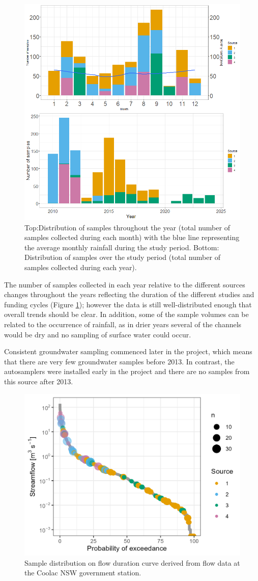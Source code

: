 \documentclass[, manuscript]{copernicus}
\begin{document}
\begin{figure}
\includegraphics[width=0.7\linewidth]{Figures/timeDist} \caption{Top:Distribution of samples throughout the year (total number of samples collected during each month) with the blue line representing the average monthly rainfall during the study period. Bottom: Distribution of samples over the study period (total number of samples collected during each year).}\label{fig:timedist-plot}
\end{figure}

The number of samples collected in each year relative to the different
sources changes throughout the years reflecting the duration of the
different studies and funding cycles (Figure \ref{fig:timedist-plot});
however the data is still well-distributed enough that overall trends
should be clear. In addition, some of the sample volumes can be related
to the occurrence of rainfall, as in drier years several of the channels
would be dry and no sampling of surface water could occur.

Consistent groundwater sampling commenced later in the project, which
means that there are very few groundwater samples before 2013. In
contrast, the autosamplers were installed early in the project and there
are no samples from this source after 2013.

\begin{figure}
\includegraphics[width=0.8\linewidth]{Figures/FDC} \caption{Sample distribution on flow duration curve derived from flow data at the Coolac NSW government station.}\label{fig:FDC}
\end{figure}
\end{document}
